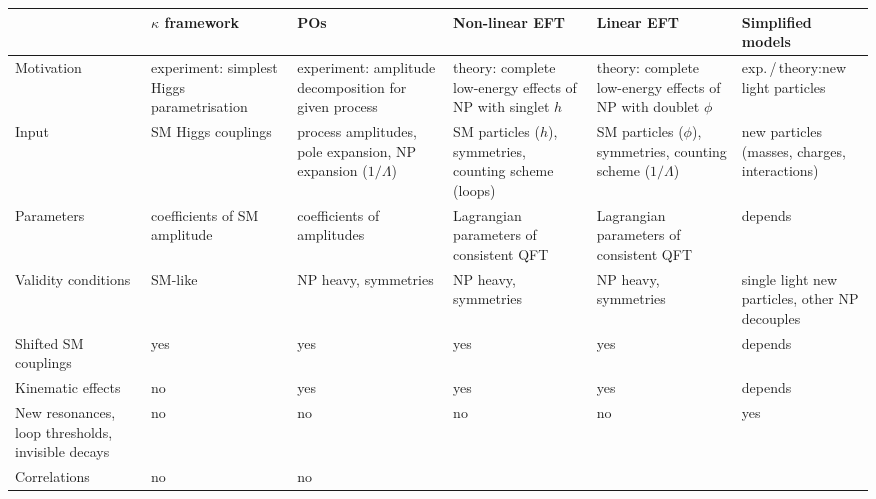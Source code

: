 \begin{table}
  \renewcommand{\arraystretch}{1.8}
  \footnotesize
  \begin{tabularx}{\textwidth}{LLLLLL} 
    \toprule 
    & $\kappa$ framework & POs & Non-linear EFT & Linear EFT & Simplified models \\
    \midrule
    Motivation & 
    experiment: \newline simplest Higgs parametrisation &
    experiment: \newline amplitude decomposition for given process &
    theory: \newline complete low-energy effects of NP with singlet $h$& 
    theory: \newline complete low-energy effects of NP with doublet $\phi$ &
    exp.\,/\,theory:\newline new light particles \\
    Input & 
    SM Higgs couplings &
    process amplitudes, \newline pole expansion,  \newline NP expansion ($1/\Lambda $)&
    SM particles ($h$), \newline symmetries, \newline counting scheme (loops) & 
    SM particles ($\phi$), \newline symmetries, \newline counting scheme ($1/\Lambda $) & 
    new particles (masses, charges, interactions) \\
    Parameters & 
    coefficients of SM amplitude &
    coefficients of amplitudes &
    Lagrangian parameters of consistent QFT & 
    Lagrangian parameters of consistent QFT &
    depends \\
    Validity conditions & 
    SM-like &
    NP heavy, symmetries &
    NP heavy, symmetries & 
    NP heavy, symmetries &
    single light new particles, other NP decouples \\
    \midrule 
    Shifted SM couplings & 
    yes &
    yes &
    yes & 
    yes &
    depends \\
    Kinematic effects & 
    no &
    yes &
    yes & 
    yes &
    depends \\
    New resonances, \newline loop thresholds, \newline invisible decays & 
    no &
    no &
    no & 
    no &
    yes \\
    Correlations & 
    no &
    no &

\end{tabularx}
\end{table}
